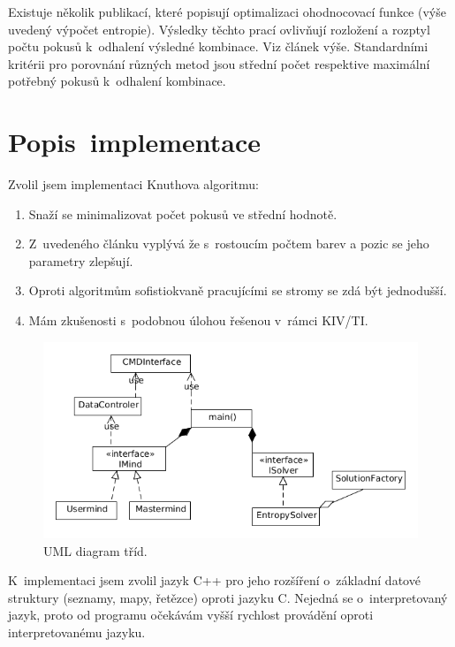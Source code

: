 \documentclass[12pt, a4paper]{article}
\begin{document}
Existuje několik publikací, které popisují optimalizaci ohodnocovací funkce (výše uvedený výpočet entropie). Výsledky těchto prací ovlivňují rozložení a rozptyl počtu pokusů k~odhalení výsledné kombinace. Viz článek výše. Standardními kritérii pro porovnání různých metod jsou střední počet respektive maximální potřebný pokusů k~odhalení kombinace.

\section{Popis~implementace} %

Zvolil jsem implementaci Knuthova algoritmu:
\begin{enumerate}
\item Snaží se minimalizovat počet pokusů ve střední hodnotě.
\item Z~uvedeného článku vyplývá že s~rostoucím počtem barev a pozic se jeho parametry zlepšují.
\item Oproti algoritmům sofistiokvaně pracujícími se stromy se zdá být jednodušší. 
\item Mám zkušenosti s~podobnou úlohou řešenou v~rámci KIV/TI.
\end{enumerate}

\begin{figure}[ht]
\centering
\includegraphics[bb= 0 0 610 320 , width=14cm]{uml.png}
\caption{UML diagram tříd.}
\label{fig:uml}
\end{figure}

K~implementaci jsem zvolil jazyk C++ pro jeho rozšíření o~základní datové struktury (seznamy, mapy, řetězce) oproti jazyku C. Nejedná se o~interpretovaný jazyk, proto od programu očekávám vyšší rychlost provádění oproti interpretovanému jazyku.
\end{document}
